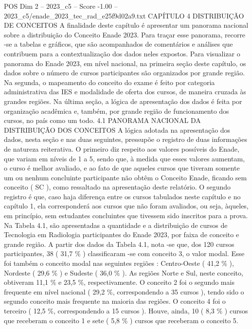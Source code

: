\begin{textsample}{POS Dim 2 – 2023\_c5 – Score -1.00 – 2023\_c5/enade\_2023\_tec\_rad\_e25f9d02a9.txt}  \label{ex:f2_pos_257}
CAPÍTULO 4 DISTRIBUIÇÃO DE CONCEITOS A finalidade deste capítulo é apresentar um panorama nacional sobre a distribuição do Conceito Enade 2023.
Para traçar esse panorama, recorre -se a tabelas e gráficos, que são acompanhados de comentários e análises que contribuem para a contextualização dos dados neles expostos.
Para visualizar o panorama do Enade 2023, em nível nacional, na primeira seção deste capítulo, os dados sobre o número de cursos participantes são organizados por grande região.
Na segunda, o mapeamento do conceito do exame é feito por categoria administrativa das IES e modalidade de oferta dos cursos, de maneira cruzada às grandes regiões.
Na última seção, a lógica de apresentação dos dados é feita por organização acadêmica e, também, por grande região de funcionamento dos cursos, no país como um todo. 4.1 PANORAMA NACIONAL DA DISTRIBUIÇÃO DOS CONCEITOS A lógica adotada na apresentação dos dados, nesta seção e nas duas seguintes, pressupõe o registro de duas informações de natureza reiterativa.
O primeiro diz respeito aos valores possíveis do Enade, que variam em níveis de 1 a 5, sendo que, à medida que esses valores aumentam, o curso é melhor avaliado, e ao fato de que aqueles cursos que tiveram somente um ou nenhum concluinte participante não obtêm o Conceito Enade, ficando sem conceito ( SC ), como ressaltado na apresentação deste relatório.
O segundo registro é que, caso haja diferença entre os cursos tabulados neste capítulo e no capítulo 1, ela corresponderá aos cursos que não foram avaliados, ou seja, àqueles, em princípio, sem estudantes concluintes que tivessem sido inscritos para a prova.
Na Tabela 4.1, são apresentadas a quantidade e a distribuição de cursos de Tecnologia em Radiologia participantes do Enade 2023, por faixa de conceito e grande região.
A partir dos dados da Tabela 4.1, nota -se que, dos 120 cursos participantes, 38 ( 31,7 \% ) classificaram -se com conceito 3, o valor modal.
Esse foi também o conceito modal nas seguintes regiões : Centro-Oeste ( 41,2 \% ), Nordeste ( 29,6 \% ) e Sudeste ( 36,0 \% ).
As regiões Norte e Sul, neste conceito, obtiveram 11,1 \% e 23,5 \%, respectivamente.
O conceito 2 foi o segundo mais frequente em nível nacional ( 29,2 \%, correspondendo a 35 cursos ), tendo sido o segundo conceito mais frequente na maioria das regiões.
O conceito 4 foi o terceiro ( 12,5 \%, correspondendo a 15 cursos ).
Houve, ainda, 10 ( 8,3 \% ) cursos que receberam o conceito 1 e sete ( 5,8 \% ) cursos que receberam o conceito 5.

\end{textsample}
